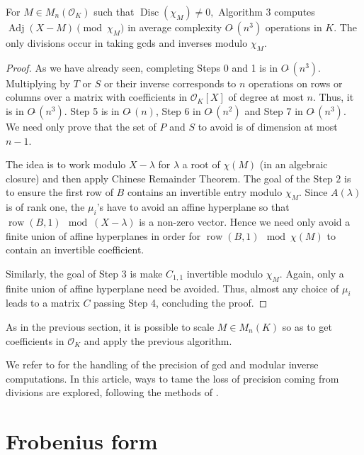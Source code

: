 \documentclass{sig-alternate-05-2015}
\DeclareMathOperator{\adj}{Adj}
\DeclareMathOperator{\disc}{Disc}
\DeclareMathOperator{\row}{row}
\newcommand{\OK}{\mathcal{O}_K}
\newcommand{\softO}{O\tilde{~}}
\begin{document}
\begin{theo}
\label{thm:alg3}
For $M \in M_n(\OK)$ such that $\disc( \chi_M) \neq 0,$
Algorithm 3 computes
$\adj (X-M) \pmod{\chi_M}$ in average complexity $\softO (n^3)$
operations in $K$.
The only divisions occur in taking gcds and inverses modulo $\chi_M$.
\end{theo}
\begin{proof}
As we have already seen, completing Steps 0 and 1 is in $\softO (n^3).$
Multiplying by $T$ or $S$ or their inverse corresponds
to $n$ operations on rows or columns over a matrix with coefficients
in $\OK[X]$ of degree at most $n$.
Thus, it is in $\softO(n^3).$
Step 5 is in $\softO(n)$, Step 6 in $\softO(n^2)$ and Step 7 in $\softO(n^3)$.
We need only prove that the set of $P$ and $S$ to avoid
is of dimension at most $n-1$.

The idea is to work modulo $X-\lambda$
for $\lambda$ a root of $\chi (M)$ (in an algebraic closure)
and then apply Chinese Remainder Theorem.
The goal of the Step $2$ is to ensure the first row of $B$ contains an
invertible entry modulo $\chi_M$.
Since $A(\lambda)$ is of rank one, the $\mu_i$'s have to avoid an
affine hyperplane so that $\row(B,1) \mod (X-\lambda)$ is a non-zero vector.
Hence we need only avoid a finite union of affine hyperplanes
in order for $\row(B,1) \mod \chi (M)$ to contain an invertible coefficient.

Similarly, the goal of Step 3 is make $C_{1,1}$ invertible modulo
$\chi_M$.  Again, only a finite union of affine
hyperplane need be avoided.
Thus, almost any choice of $\mu_i$ leads to a matrix $C$ passing
Step 4, concluding the proof.
\end{proof}


\begin{rem}
As in the previous section, it is possible
to scale $M \in M_n(K)$ so as to
get coefficients in $\OK$ and apply the previous algorithm.
\end{rem}
\begin{rem}
We refer to \cite{caruso:15a} for the handling
of the precision of gcd and modular inverse computations.
In this article, ways to tame the loss of precision
coming from divisions are explored, following
the methods of \cite{caruso-roe-vaccon:14a}.
\end{rem}


\section{Frobenius form}
\label{sec:diffFrob}
\end{document}
